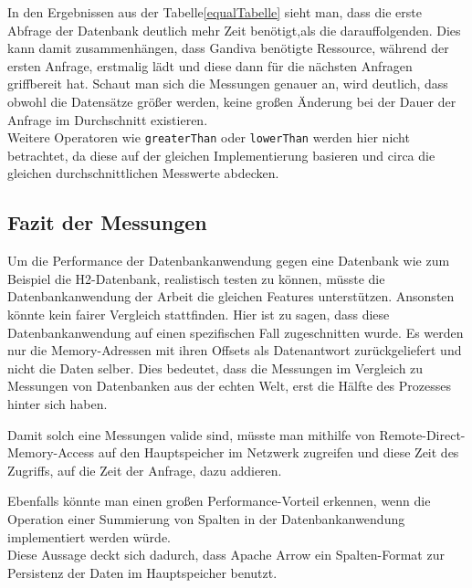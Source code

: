 In den Ergebnissen aus der Tabelle\ref{equalTabelle} sieht man, dass die erste Abfrage der Datenbank deutlich mehr Zeit benötigt,als die darauffolgenden. Dies kann damit zusammenhängen, dass Gandiva benötigte Ressource, während der ersten Anfrage, erstmalig lädt und diese dann für die nächsten Anfragen griffbereit hat.
Schaut man sich die Messungen genauer an, wird deutlich, dass obwohl die Datensätze größer werden, keine großen Änderung bei der Dauer der Anfrage im Durchschnitt existieren.\\
Weitere Operatoren wie \texttt{greaterThan} oder \texttt{lowerThan} werden hier nicht betrachtet, da diese auf der gleichen Implementierung basieren und circa die gleichen durchschnittlichen Messwerte abdecken.

\subsection{Fazit der Messungen}

Um die Performance der Datenbankanwendung gegen eine Datenbank wie zum Beispiel die H2-Datenbank, realistisch testen zu können, müsste die Datenbankanwendung der Arbeit die gleichen Features unterstützen. Ansonsten könnte kein fairer Vergleich stattfinden. Hier ist zu sagen, dass diese Datenbankanwendung auf einen spezifischen Fall zugeschnitten wurde. Es werden nur die Memory-Adressen mit ihren Offsets als Datenantwort zurückgeliefert und nicht die Daten selber. 
Dies bedeutet, dass die Messungen im Vergleich zu Messungen von Datenbanken aus der echten Welt, erst die Hälfte des Prozesses hinter sich haben. 

Damit solch eine Messungen valide sind, müsste man mithilfe von Remote-Direct-Memory-Access auf den Hauptspeicher im Netzwerk zugreifen und diese Zeit des Zugriffs, auf die Zeit der Anfrage, dazu addieren.

Ebenfalls könnte man einen großen Performance-Vorteil erkennen, wenn die Operation einer Summierung von Spalten in der Datenbankanwendung implementiert werden würde.\\
Diese Aussage deckt sich dadurch, dass Apache Arrow ein Spalten-Format zur Persistenz der Daten im Hauptspeicher benutzt.



